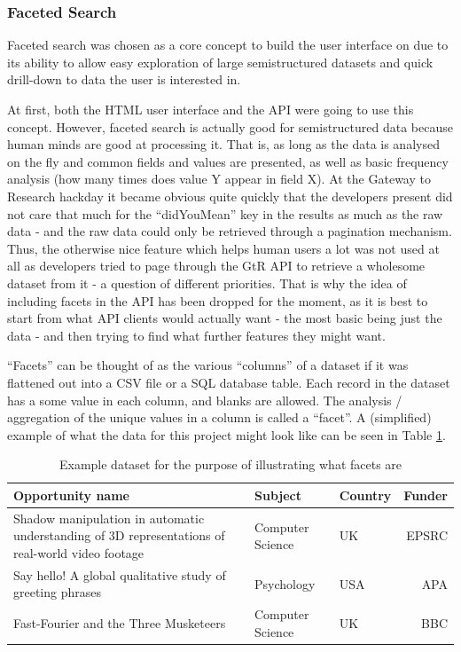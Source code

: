 \subsubsection{Faceted Search}
\label{faceted-search}
Faceted search \cite{faceted} was chosen as a core concept to build the user interface on due to its ability to allow easy exploration of large semistructured datasets and quick drill-down to data the user is interested in.

At first, both the HTML user interface and the API were going to use this concept. However, faceted search is actually good for semistructured data because human minds are good at processing it. That is, as long as the data is analysed on the fly and  common fields and values are presented, as well as basic frequency analysis (how many times does value Y appear in field X). At the Gateway to Research hackday it became obvious quite quickly that the developers present did not care that much for the ``didYouMean'' key in the results as much as the raw data - and the raw data could only be retrieved through a pagination mechanism. Thus, the otherwise nice feature which helps human users a lot was not used at all as developers tried to page through the GtR API to retrieve a wholesome dataset from it - a question of different priorities. That is why the idea of including facets in the API has been dropped for the moment, as it is best to start from what API clients would actually want - the most basic being just the data - and then trying to find what further features they might want.

``Facets'' can be thought of as the various ``columns'' of a dataset if it was flattened out into a CSV file or a SQL database table. Each record in the dataset has a some value in each column, and blanks are allowed. The analysis / aggregation of the unique values in a column is called a ``facet''. A (simplified) example of what the data for this project might look like can be seen in Table \ref{tab:facets-example}.

\begin{table}[!h]
\centering
\begin{tabular}{p{8cm}|l|l|r}
	Opportunity name & Subject & Country & Funder\\
	\hline
	Shadow manipulation in automatic understanding of 3D representations of real-world video footage & Computer Science & UK & EPSRC\\[6pt]
	Say hello! A global qualitative study of greeting phrases & Psychology & USA & APA\\[6pt]
	Fast-Fourier and the Three Musketeers & Computer Science & UK & BBC\\
\end{tabular}
\caption{Example dataset for the purpose of illustrating what facets are}
\label{tab:facets-example}
\end{table}

